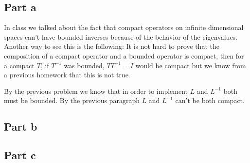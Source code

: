 \documentclass[12pt]{article}%
\begin{document}
\subsection*{Part a}
In class we talked about the fact that compact operators on infinite
dimensional spaces can't have bounded inverses because of the behavior of the
eigenvalues. Another way to see this is the following: It is not hard to prove
that the composition of a compact operator and a bounded operator is compact,
then for a compact $T$, if $T^{-1}$ was bounded, $TT^{-1}=I$ would be compact
but we know from a previous homework that this is not true.

By the previous problem we know that in order to implement $L$ and $L^{-1}$
both must be bounded. By the previous paragraph $L$ and $L^{-1}$ can't be both
compact.
\subsection*{Part b}
\subsection*{Part c}
\end{document}
